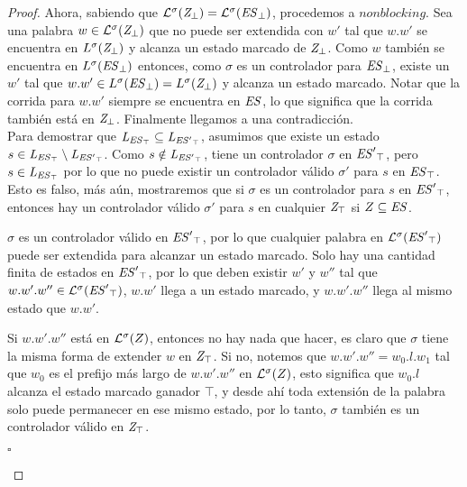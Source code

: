 \begin{proof}
Ahora, sabiendo que $\mathcal{L}^\sigma(\mathit{{Z}_{\bot}}) = 
\mathcal{L}^\sigma(\mathit{{\mathit{ES}}_{\bot}})$, procedemos a $nonblocking$. Sea una palabra $w \in 
\mathcal{L}^\sigma(\mathit{{Z}_{\bot}})$ que no puede ser extendida con $w'$ tal que $w.w'$ se encuentra en $L^\sigma(\mathit{{Z}_{\bot}})$ y alcanza un estado marcado de $\mathit{{Z}_{\bot}}$. 
Como $w$ también se encuentra en $L^\sigma(\mathit{{\mathit{ES}}_{\bot}})$ entonces, como $\sigma$ es un controlador para $\mathit{{\mathit{ES}}_{\bot}}$, existe un $w'$ tal que
$w.w' \in L^\sigma(\mathit{{\mathit{ES}}_{\bot}}) = L^\sigma(\mathit{{Z}_{\bot}})$ y alcanza un estado marcado. Notar que la corrida para $w.w'$ siempre se encuentra en $\mathit{ES}$, lo que significa que la corrida también está en $\mathit{{Z}_{\bot}}$. Finalmente llegamos a una contradicción.\\

Para demostrar que $\mathit{L_{\mathit{{\mathit{ES}}_{\top}}}} \subseteq \mathit{L_{\mathit{{\mathit{ES}'}_{\top}}}}$, asumimos que existe un estado $s \in \mathit{L_{\mathit{{\mathit{ES}}_{\top}}}} \setminus \mathit{L_{\mathit{{\mathit{ES}'}_{\top}}}}$. Como $s \notin \mathit{L_{\mathit{{\mathit{ES}'}_{\top}}}}$, tiene un controlador $\sigma$ en $\mathit{{\mathit{ES}'}_{\top}}$, pero $s \in \mathit{L_{\mathit{{\mathit{ES}}_{\top}}}}$ por lo que no puede existir un controlador válido $\sigma'$ para $s$ en $\mathit{{\mathit{ES}}_{\top}}$. Esto es falso, más aún, mostraremos que si $\sigma$ es un controlador para $s$ en $\mathit{{\mathit{ES}'}_{\top}}$, entonces hay un controlador válido $\sigma'$ para $s$ en cualquier $\mathit{{Z}_{\top}}$ si $Z \subseteq \mathit{ES}$.

$\sigma$ es un controlador válido en $\mathit{{\mathit{ES}'}_{\top}}$, por lo que cualquier palabra en $\mathcal{L}^\sigma(\mathit{{\mathit{ES}'}_{\top}})$ puede ser extendida para alcanzar un estado marcado. Solo hay una cantidad finita de estados en  $\mathit{{\mathit{ES}'}_{\top}}$, por lo que deben existir $w'$ y $w''$ tal que $w.w'.w'' \in \mathcal{L}^\sigma(\mathit{{\mathit{ES}'}_{\top}})$, $w.w'$ llega a un estado marcado, y $w.w'.w''$ llega al mismo estado que $w.w'$.

Si $w.w'.w''$ está en $\mathcal{L}^\sigma(Z)$, entonces no hay nada que hacer, es claro que $\sigma$ tiene la misma forma de extender $w$ en $\mathit{{Z}_{\top}}$. Si no, notemos que $w.w'.w'' = w_0.l.w_1$ tal que $w_0$ es el prefijo más largo de $w.w'.w''$ en $\mathcal{L}^\sigma(Z)$, esto significa que $w_0.l$ alcanza el estado marcado ganador $\top$, y desde ahí toda extensión de la palabra solo puede permanecer en ese mismo estado, por lo tanto, $\sigma$ también es un controlador válido en  $\mathit{{Z}_{\top}}$.
 
\begin{flushright}
$\square$
\end{flushright}

\end{proof}


